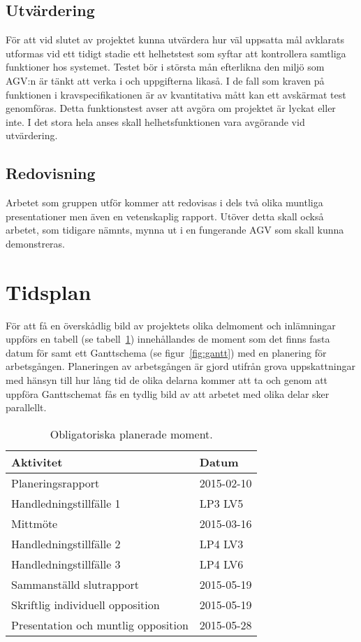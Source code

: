 \documentclass[a4paper,11pt]{article}
\begin{document}
\subsection{Utvärdering}
För att vid slutet av projektet kunna utvärdera hur väl uppsatta mål
avklarats utformas vid ett tidigt stadie ett helhetstest som syftar att
kontrollera samtliga funktioner hos systemet. Testet bör i största mån
efterlikna den miljö som AGV:n är tänkt att verka i och uppgifterna likaså.
I de fall som kraven på funktionen i kravspecifikationen är av kvantitativa
mått kan ett avskärmat test genomföras. Detta funktionstest avser att
avgöra om projektet är lyckat eller inte. I det stora hela anses skall
helhetsfunktionen vara avgörande vid utvärdering.

\subsection{Redovisning}
Arbetet som gruppen utför kommer att redovisas i dels två olika muntliga
presentationer men även en vetenskaplig rapport. Utöver detta skall också
arbetet, som tidigare nämnts, mynna ut i en fungerande AGV som skall kunna
demonstreras.



\section{Tidsplan}
För att få en överskådlig bild av projektets olika delmoment och
inlämningar uppförs en tabell (se tabell~\ref{tab:planeringstabell})
innehållandes de moment som det finns fasta datum för samt ett Ganttschema
(se figur~\ref{fig:gantt}) med en planering för arbetsgången. Planeringen
av arbetsgången är gjord utifrån grova uppskattningar med hänsyn till hur
lång tid de olika delarna kommer att ta och genom att uppföra Ganttschemat
fås en tydlig bild av att arbetet med olika delar sker parallellt.

\begin{table}[h]
  \begin{center}
    \begin{tabular}{l | l}
      Aktivitet                           & Datum      \\ \hline
      Planeringsrapport                   & 2015-02-10 \\
      Handledningstillfälle 1             & LP3 LV5    \\
      Mittmöte                            & 2015-03-16 \\
      Handledningstillfälle 2             & LP4 LV3    \\
      Handledningstillfälle 3             & LP4 LV6    \\
      Sammanställd slutrapport            & 2015-05-19 \\
      Skriftlig individuell opposition    & 2015-05-19 \\
      Presentation och muntlig opposition & 2015-05-28 \\
    \end{tabular}
  \end{center}
  \caption{Obligatoriska planerade moment.}
  \label{tab:planeringstabell}
\end{table}
\end{document}
